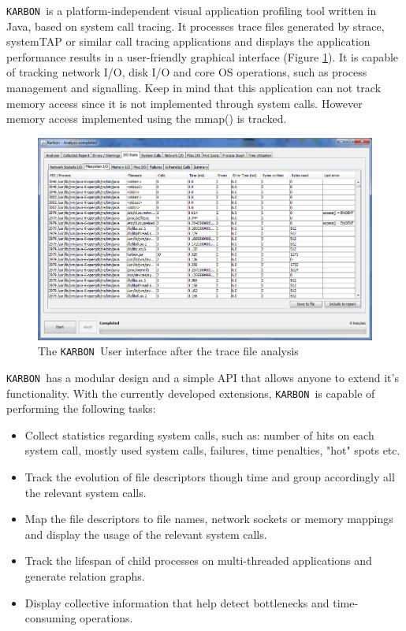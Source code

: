 \documentclass[12pt,a4paper]{scrreprt}
\newcommand{\karbon}{\texttt{KARBON {}}}
\begin{document}
\karbon is a platform-independent visual application profiling tool written in Java, based on system call tracing. It processes trace files generated by strace, systemTAP or similar call tracing applications and displays the application performance results in a user-friendly graphical interface (Figure \ref{screen}). It is capable of tracking network I/O, disk I/O and core OS operations, such as process management and signalling. Keep in mind that this application can not track memory access since it is not implemented through system calls. However memory access implemented using the mmap() is tracked.

\begin{figure}
	\centering
    	\includegraphics[]{screen-14.png}
	\caption{The \karbon User interface after the trace file analysis}
	\label{screen}
\end{figure}

\karbon has a modular design and a simple API that allows anyone to extend it's functionality. With the currently developed extensions, \karbon is capable of performing the following tasks:
\begin{itemize}
	\item Collect statistics regarding system calls, such as: number of hits on each system call, mostly used system calls, failures, time penalties, "hot" spots etc.
	\item Track the evolution of file descriptors though time and group accordingly all the relevant system calls.
	\item Map the file descriptors to file names, network sockets or memory mappings and display the usage of the relevant system calls.
	\item Track the lifespan of child processes on multi-threaded applications and generate relation graphs.
	\item Display collective information that help detect bottlenecks and time-consuming operations.
\end{itemize}
\end{document}
